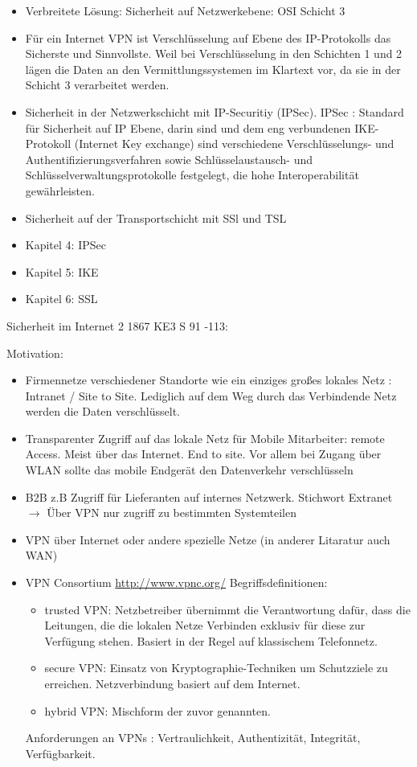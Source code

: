 \begin{itemize}
\begin{itemize}
  					\item Verbreitete Lösung: Sicherheit auf Netzwerkebene: OSI Schicht 3
  					\item Für ein Internet VPN ist Verschlüsselung auf Ebene des IP-Protokolls das Sicherste und Sinnvollste. Weil bei Verschlüsselung in den Schichten 1 und 2 lägen die Daten an den Vermittlungssystemen im Klartext vor, da sie in der Schicht 3 verarbeitet werden. 
  					\item Sicherheit in der Netzwerkschicht mit IP-Securitiy (IPSec). IPSec : Standard für Sicherheit auf IP Ebene, darin sind und dem eng verbundenen IKE-Protokoll (Internet Key exchange) sind verschiedene Verschlüsselungs- und Authentifizierungsverfahren sowie Schlüsselaustausch- und Schlüsselverwaltungsprotokolle festgelegt, die hohe Interoperabilität gewährleisten. 
  					\item Sicherheit auf der Transportschicht mit SSl und TSL
  					\item Kapitel 4: IPSec
  					\item Kapitel 5: IKE
  					\item Kapitel 6: SSL
  					\end{itemize}					
 
\end{itemize}


Sicherheit im Internet 2 1867 KE3 S 91 -113: 

Motivation:
\begin{itemize}
	\item Firmennetze verschiedener Standorte wie ein einziges großes lokales Netz : Intranet / Site to Site. Lediglich auf dem Weg durch das Verbindende Netz werden die Daten verschlüsselt.
	\item Transparenter Zugriff auf das lokale Netz für Mobile Mitarbeiter: remote Access. Meist über das Internet. End to site. Vor allem bei Zugang über WLAN sollte das mobile Endgerät den Datenverkehr verschlüsseln  
	\item B2B z.B Zugriff für Lieferanten auf internes Netzwerk. Stichwort Extranet $\rightarrow$ Über VPN nur zugriff zu bestimmten Systemteilen
	\item VPN über Internet oder andere spezielle Netze  (in anderer Litaratur auch WAN)
	\item VPN Consortium \url{http://www.vpnc.org/} Begriffsdefinitionen: 
		\begin{itemize}
		\item trusted VPN: Netzbetreiber übernimmt die Verantwortung dafür, dass die Leitungen, die die lokalen Netze Verbinden  exklusiv für diese zur Verfügung stehen. Basiert in der Regel auf klassischem Telefonnetz.
		\item secure VPN: Einsatz von Kryptographie-Techniken um Schutzziele zu erreichen. Netzverbindung basiert auf dem Internet. 
		\item hybrid VPN: Mischform der zuvor genannten.
		\end{itemize}
		Anforderungen an VPNs : Vertraulichkeit, Authentizität, Integrität, Verfügbarkeit. 
\end{itemize}

